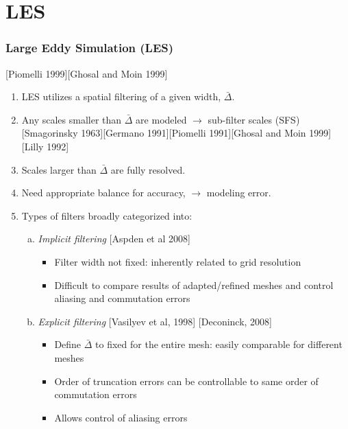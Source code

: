 \documentclass{beamer}
\begin{document}
\section{LES}
\begin{frame}
\frametitle{Large Eddy Simulation (LES)}
\scriptsize
\begin{minipage}[t][1\textheight]{1\textwidth}
[Piomelli 1999][Ghosal and Moin 1999]
\begin{enumerate}[1.]
\setlength\itemsep{0.3em}
\item LES utilizes a spatial filtering of a given width, $\bar{\Delta} $. 
\item Any scales smaller than  $\bar{\Delta} $  are modeled $\rightarrow$ sub-filter scales (SFS) [Smagorinsky 1963][Germano 1991][Piomelli 1991][Ghosal and Moin 1999][Lilly 1992]
\item Scales larger than $\bar{\Delta}$ are fully resolved.
\item Need appropriate balance for accuracy, $\rightarrow$ modeling error. 
\item Types of filters broadly categorized into:\par
\begin{enumerate}[(a)]
\tiny
\vspace{-2pt}
\item {\scriptsize{\textit{Implicit filtering} [Aspden et al 2008]}}
\begin{itemize}

\item Filter width not fixed: inherently related to grid resolution
\item Difficult to compare results of adapted/refined meshes and control aliasing and commutation errors
\end{itemize}

\vspace{-2pt}
\item {\scriptsize{\textit{Explicit filtering} [Vasilyev et al, 1998] [Deconinck, 2008]}}
\begin{itemize}

\item Define $\bar{\Delta} $ to fixed for the entire mesh: easily comparable for different meshes
\item Order of truncation errors can be controllable to same order of commutation errors
\item Allows control of aliasing errors
\end{itemize}

\end{enumerate}

\end{enumerate}
\end{minipage}

\end{frame}
\end{document}
